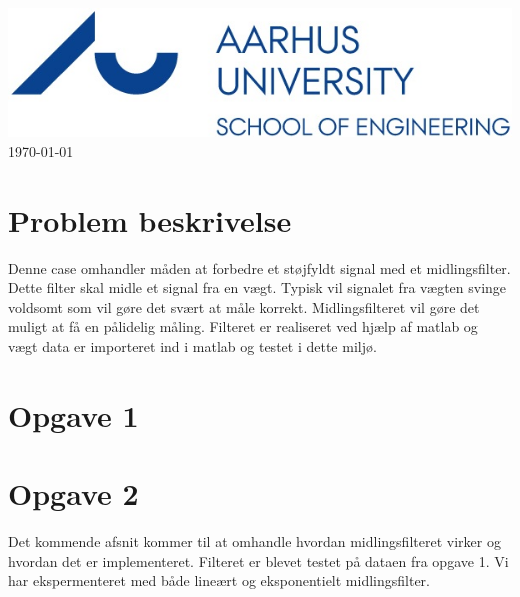 \documentclass[12pt]{article}
\begin{document}
\begin{titlepage}

\includegraphics[scale=0.5]{Img/logo.jpg}\\[1cm]


{\large \today}\\[0.5cm] %


\vfill %

\end{titlepage}

\newpage
\tableofcontents
\newpage
\listoffigures
\newpage

\hypersetup{linkcolor=blue}

\section{Problem beskrivelse}
\begin{flushleft}
	
	
	Denne case omhandler måden at forbedre et støjfyldt signal med et midlingsfilter. Dette filter skal midle et signal fra en vægt. Typisk vil signalet fra vægten svinge voldsomt som vil gøre det svært at måle korrekt. Midlingsfilteret vil gøre det muligt at få en pålidelig måling. Filteret er realiseret ved hjælp af matlab og vægt data er importeret ind i matlab og testet i dette miljø.
\end{flushleft}

\section{Opgave 1}

\section{Opgave 2}
Det kommende afsnit kommer til at omhandle hvordan midlingsfilteret virker og hvordan det er implementeret. Filteret er blevet testet på dataen fra opgave 1. Vi har ekspermenteret med både lineært og eksponentielt midlingsfilter. 
\end{document}
